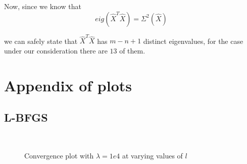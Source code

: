 \noindent Now, since we know that 
\begin{equation}
    eig(\hat{X}^T \hat{X}) = \Sigma^2(\hat{X})
    \label{eq:appendix_sv}
\end{equation}

\noindent we can safely state that $\hat{X}^T\hat{X}$ has $m-n+1$ distinct eigenvalues, for the case under our consideration there are $13$ of them.

\newpage

\section{Appendix of plots}
\subsection{L-BFGS}\label{appendix:lbfgs_plots}
\begin{figure}[H]
    \centering
     \\
    \caption{Convergence plot with $\lambda=1e4$ at varying values of $l$}
    \label{fig:lbfgs_1e4_l}
\end{figure}

